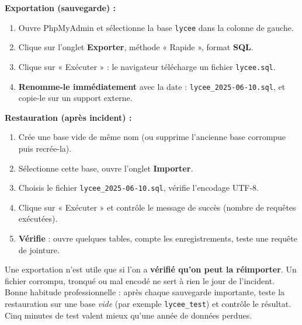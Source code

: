 \documentclass[11pt]{article}
\begin{document}
\begin{methode}
\textbf{Exportation (sauvegarde) :}
\begin{enumerate}
\item Ouvre PhpMyAdmin et sélectionne la base \texttt{lycee} dans la colonne de gauche.
\item Clique sur l'onglet \textbf{Exporter}, méthode « Rapide », format \textbf{SQL}.
\item Clique sur « Exécuter » : le navigateur télécharge un fichier \texttt{lycee.sql}.
\item \textbf{Renomme-le immédiatement} avec la date : \texttt{lycee\_2025-06-10.sql}, et copie-le sur un support externe.
\end{enumerate}
\textbf{Restauration (après incident) :}
\begin{enumerate}
\item Crée une base vide de même nom (ou supprime l'ancienne base corrompue puis recrée-la).
\item Sélectionne cette base, ouvre l'onglet \textbf{Importer}.
\item Choisis le fichier \texttt{lycee\_2025-06-10.sql}, vérifie l'encodage UTF-8.
\item Clique sur « Exécuter » et contrôle le message de succès (nombre de requêtes exécutées).
\item \textbf{Vérifie} : ouvre quelques tables, compte les enregistrements, teste une requête de jointure.
\end{enumerate}
\end{methode}

\begin{attention}
Une exportation n'est utile que si l'on a \textbf{vérifié qu'on peut la réimporter}. Un fichier corrompu, tronqué ou mal encodé ne sert à rien le jour de l'incident. Bonne habitude professionnelle : après chaque sauvegarde importante, teste la restauration sur une base \emph{vide} (par exemple \texttt{lycee\_test}) et contrôle le résultat. Cinq minutes de test valent mieux qu'une année de données perdues.
\end{attention}
\end{document}
